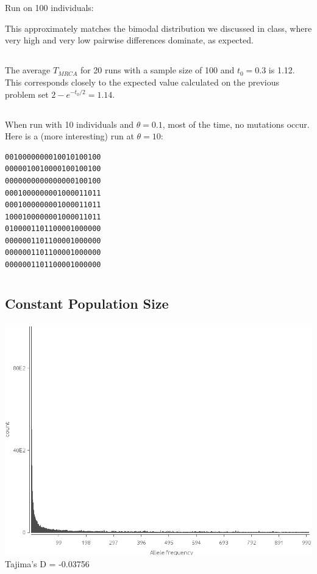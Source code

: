 \documentclass{article}
\begin{document}
\section{}
\subsection{}
Run on 100 individuals:



This approximately matches the bimodal distribution we discussed in class, where
very high and very low pairwise differences dominate, as expected.
\subsection{}
The average $T_{MRCA}$ for 20 runs with a sample size of 100 and $t_0 = 0.3$ is
1.12.  This corresponds closely to the expected value calculated on the previous
problem set $2 - e^{-t_0/2} = 1.14$.
\subsection{}
\subsubsection{}
When run with 10 individuals and $\theta = 0.1$, most of the time, no mutations
occur.  Here is a (more interesting) run at $\theta = 10$:
\begin{verbatim}
0010000000010010100100
0000010010000100100100
0000000000000000100100
0001000000001000011011
0001000000001000011011
1000100000001000011011
0100001101100001000000
0000001101100001000000
0000001101100001000000
0000001101100001000000
\end{verbatim}
\subsubsection{}

\section{}
\subsection{Constant Population Size}
\includegraphics[width=\textwidth]{constant_size}
Tajima's D = -0.03756
\end{document}
